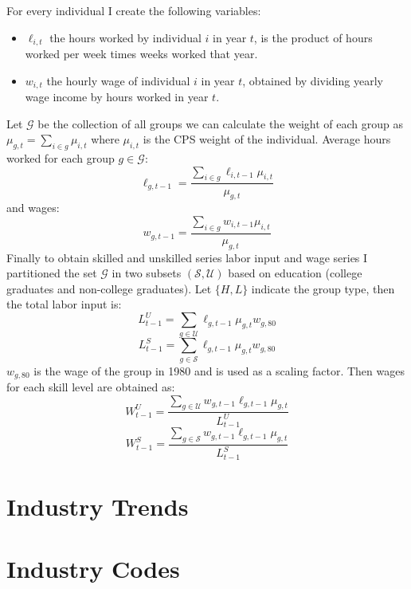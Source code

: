 \documentclass[12pt]{article}
\begin{document}
For every individual I create the following variables:
\begin{itemize}
\item $\ell_{i,t}$ the hours worked by individual $i$ in year $t$, is the product of hours worked per week times weeks worked that year.
\item $w_{i,t}$ the hourly wage of individual $i$ in year $t$, obtained by dividing yearly wage income by hours worked in year $t$.
\end{itemize}

Let $\mathcal{G}$ be the collection of all groups we can calculate the weight of each group as $\mu_{g,t} = \sum_{i\in g} \mu_{i,t}$ where $ \mu_{i,t}$ is the CPS weight of the individual. Average hours worked for each group $g\in\mathcal{G}$: 
\[
\ell_{g, t-1} = \frac{\sum_{i\in g}\ell_{i,t-1} \mu_{i,t}}{\mu_{g, t}}
\]
and wages:
\[
w_{g, t-1} = \frac{\sum_{i\in g}w_{i,t-1} \mu_{i,t}}{\mu_{g, t}}
\]
Finally to obtain skilled and unskilled series labor input and wage series I partitioned the set $\mathcal{G}$ in two subsets $(\mathcal{S}, \mathcal{U})$ based on education (college graduates and non-college graduates). Let $\{H, L\}$ indicate the group type, then the total labor input is:
\[
 L^U_{t-1} = \sum_{g \in\mathcal{U}} \ell_{g, t-1} \mu_{g,t} w_{g,80}
\]
\[
 L^S_{t-1} = \sum_{g \in\mathcal{S}} \ell_{g, t-1} \mu_{g,t} w_{g,80}
\]
$w_{g,80}$ is the wage of the group in 1980 and is used as a scaling factor. Then wages for each skill level are obtained as:
\[
W^U_{t-1} = \frac{\sum_{g \in \mathcal{U}} w_{g, t-1} \ell_{g, t-1} \mu_{g,t}}{L^U_{t-1}}
\]
\[
W^S_{t-1} = \frac{\sum_{g \in \mathcal{S}} w_{g, t-1} \ell_{g, t-1} \mu_{g,t}}{L^S_{t-1}}
\]

\section{Industry Trends}\label{sec:industry-trends}

\section{Industry Codes}
\end{document}
